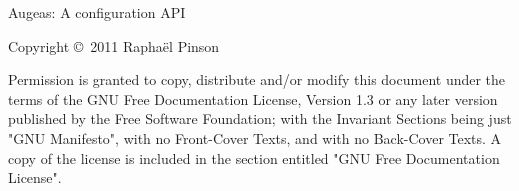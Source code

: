 \cleardoublepage
Augeas: A configuration API

Copyright \copyright~2011 Raphaël Pinson

Permission is granted to copy, distribute and/or modify this document under the terms of the GNU Free Documentation License, Version 1.3 or any later version published by the Free Software Foundation; with the Invariant Sections being just "GNU Manifesto", with no Front-Cover Texts, and with no Back-Cover Texts.  A copy of the license is included in the section entitled "GNU Free Documentation License".
